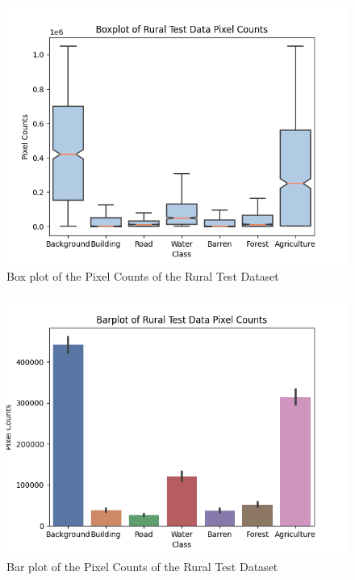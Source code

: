 \begin{figure}[!h]
\includegraphics[width=15.0cm, height=8.5cm]{images/rural test boxplot.png}
\centering
\caption{Box plot of the Pixel Counts of the Rural Test Dataset}
\label{fig:boxplot-rural-test}
\end{figure}

\begin{figure}[!h]
\includegraphics[width=15.0cm, height=8.5cm]{images/rural test barplot.png}
\centering
\caption{Bar plot of the Pixel Counts of the Rural Test Dataset}
\label{fig:barplot-rural-test}
\end{figure}


